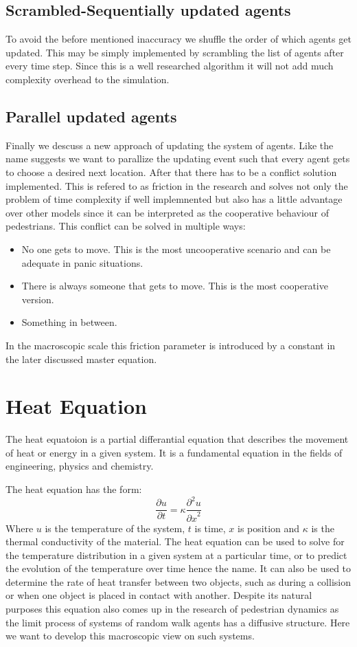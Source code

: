 \subsection{Scrambled-Sequentially updated agents}
To avoid the before mentioned inaccuracy we shuffle the order of which agents get updated. This may be simply implemented by scrambling the list of agents after every time step.
Since this is a well researched algorithm it will not add much complexity overhead to the simulation. 

\subsection{Parallel updated agents}
Finally we descuss a new approach of updating the system of agents. Like the name suggests we want to parallize the updating event such that every agent gets to choose a desired next location. After that there has to be a conflict solution implemented.
This is refered to as friction in the research and solves not only the problem of time complexity if well implemnented but also has a little advantage over other models since it can be interpreted as the cooperative behaviour of pedestrians. 
This conflict can be solved in multiple ways: 
\begin{itemize}
   \item No one gets to move. This is the most uncooperative scenario and can be adequate in panic situations.
   \item There is always someone that gets to move. This is the most cooperative version.
   \item Something in between. 
\end{itemize} 
In the macroscopic scale this friction parameter is introduced by a constant in the later discussed master equation.

\newpage
\section{Heat Equation}
The heat equatoion is a partial differantial equation that describes the movement of heat or energy in a given system.
It is a fundamental equation in the fields of engineering, physics and chemistry.

The heat equation has the form: 
\begin{equation}
\frac{\partial u}{\partial t} = \kappa \frac{{\partial}^2u}{{\partial x}^2}
\end{equation}
Where $u$ is the temperature of the system, $t$ is time, $x$ is position and $\kappa$ is the thermal conductivity of the material.
The heat equation can be used to solve for the temperature distribution in a given system at a particular time, or to predict the evolution of the temperature over time hence the name. It can also be used to determine the rate of heat transfer between two objects, such as during a collision or when one object is placed in contact with another.
Despite its natural purposes this equation also comes up in the research of pedestrian dynamics as the limit process of systems of random walk agents has a diffusive structure. Here we want to develop this macroscopic view on such systems.

